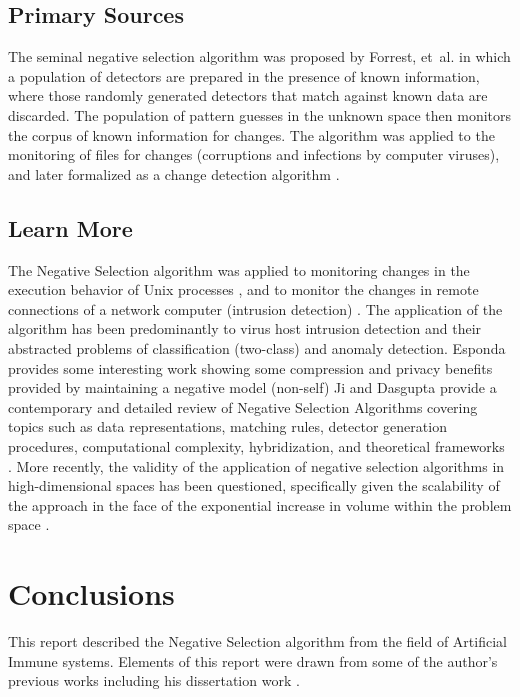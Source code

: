 \documentclass[a4paper, 11pt]{article}
\begin{document}
\subsection{Primary Sources}
The seminal negative selection algorithm was proposed by Forrest, et~al. \cite{Forrest1994} in which a population of detectors are prepared in the presence of known information, where those randomly generated detectors that match against known data are discarded. The population of pattern guesses in the unknown space then monitors the corpus of known information for changes. The algorithm was applied to the monitoring of files for changes (corruptions and infections by computer viruses), and later formalized as a change detection algorithm \cite{D'haeseleer1996a, D'haeseleer1996}.

% 
% 
\subsection{Learn More}
The Negative Selection algorithm was applied to monitoring changes in the execution behavior of Unix processes \cite{Forrest1996, Hofmeyr1998}, and to monitor the changes in remote connections of a network computer (intrusion detection) \cite{Hofmeyr1999, Hofmeyr1999a}. The application of the algorithm has been predominantly to virus host intrusion detection and their abstracted problems of classification (two-class) and anomaly detection.
Esponda provides some interesting work showing some compression and privacy benefits provided by maintaining a negative model (non-self) \cite{Darlington2005}
Ji and Dasgupta provide a contemporary and detailed review of Negative Selection Algorithms covering topics such as data representations, matching rules, detector generation procedures, computational complexity, hybridization, and theoretical frameworks \cite{Ji2007}.
More recently, the validity of the application of negative selection algorithms in high-dimensional spaces has been questioned, specifically given the scalability of the approach in the face of the exponential increase in volume within the problem space \cite{Stibor2006}.

% 
% 
\section{Conclusions}
\label{sec:conclusions}
This report described the Negative Selection algorithm from the field of Artificial Immune systems.
Elements of this report were drawn from some of the author's previous works including his dissertation work \cite{Brownlee2008}.
\end{document}
